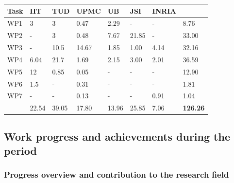 \documentclass[12pt,a4paper,twoside]{article}
\begin{document}
\begin{longtable}{|C{1.5cm}|C{1.5cm}|C{1.5cm}|C{1.5cm}|C{1.5cm}|C{1.5cm}|C{1.5cm}|C{1.5cm}|}
\footnotesize \textbf{Task}& \footnotesize \textbf{IIT}&\footnotesize \textbf{TUD}&\footnotesize \textbf{UPMC}& \footnotesize \textbf{UB} &\footnotesize \textbf{JSI} &\footnotesize \textbf{INRIA} &  \\ \hline
\footnotesize WP1      &  3        &  3      &  0.47   &  2.29  &  -     &  -     &  8.76 \\  \hline
\footnotesize WP2      &  -        &  3      &  0.48   &  7.67  &  21.85 &  -     &  33.00\\  \hline
\footnotesize WP3      &  -        &  10.5   &  14.67  &  1.85  &  1.00  &  4.14  &  32.16\\  \hline
\footnotesize WP4      &  6.04     &  21.7   &  1.69   &  2.15  &  3.00  &  2.01  &  36.59\\  \hline
\footnotesize WP5      &  12       &  0.85   &  0.05   &  -     &  -     &  -     &  12.90\\  \hline
\footnotesize WP6      &  1.5      &  -      &  0.31   &  -     &  -     &  -     &  1.81 \\  \hline
\footnotesize WP7      &  -        &  -      &  0.13   &  -     &  -     &  0.91  &  1.04 \\  \hline
{}  &  22.54    &  39.05  &  17.80  &  13.96 &  25.85 &  7.06  &  
\textbf{126.26}     \\  
\end{longtable}










\subsection{Work progress and achievements during the period}

\subsubsection{Progress overview and contribution to the research field}
\end{document}

